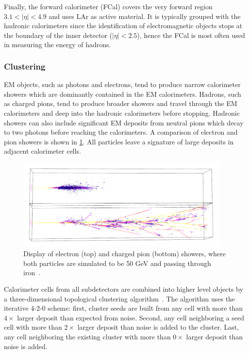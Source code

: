 Finally, the forward calorimeter (FCal) covers the very forward region $3.1 < |\eta| < 4.9$ and uses LAr as active material. It is typically grouped with the hadronic calorimeters since the identification of electromagnetic objects stops at the boundary of the inner detector ($|\eta| < 2.5$), hence the FCal is most often used in measuring the energy of hadrons.

\subsubsection{Clustering}

EM objects, such as photons and electrons, tend to produce narrow calorimeter showers which are dominantly contained in the EM calorimeters. Hadrons, such as charged pions, tend to produce broader showers and travel through the EM calorimeters and deep into the hadronic calorimeters before stopping. Hadronic showers can also include significant EM deposits from neutral pions which decay to two photons before reaching the calorimeters. A comparison of electron and pion showers is shown in \cref{fig:atlas-detector-showers}. All particles leave a signature of large deposits in adjacent calorimeter cells.

\begin{figure}[tp]
  \centering
  \includegraphics[width=0.95\textwidth]{figures/lhc-atlas/svenmenke_showers}
  \caption{Display of electron (top) and charged pion (bottom) showers, where both particles are simulated to be 50 GeV and passing through iron~\cite{svenmenke-showers}.}
  \label{fig:atlas-detector-showers}
\end{figure}

Calorimeter cells from all subdetectors are combined into higher level objects by a three-dimensional topological clustering algorithm~\cite{ATL-LARG-PUB-2008-002}. The algorithm uses the iterative \textsc{4-2-0} scheme: first, cluster seeds are built from any cell with more than $4\times$ larger deposit than expected from noise. Second, any cell neighboring a seed cell with more than $2\times$ larger deposit than noise is added to the cluster. Last, any cell neighboring the existing cluster with more than $0\times$ larger deposit than noise is added.

